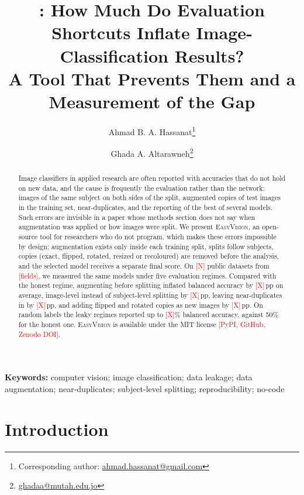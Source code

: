\documentclass[11pt,a4paper]{article}
\title{\EV: How Much Do Evaluation Shortcuts Inflate Image-Classification Results?\\ A Tool That Prevents Them and a Measurement of the Gap}
\author[1]{Ahmad B. A. Hassanat\thanks{Corresponding author: \href{mailto:ahmad.hassanat@gmail.com}{ahmad.hassanat@gmail.com}}}
\author[2]{Ghada A. Altarawneh\thanks{\href{mailto:ghadaa@mutah.edu.jo}{ghadaa@mutah.edu.jo}}}
\affil[1]{Faculty of Information Technology, Mutah University, Karak, Jordan}
\affil[2]{Department of Accounting, Mutah University, Karak, Jordan}
\date{\TBD{Plan and skeleton, 10 October 2026}}
\newcommand{\EV}{\textsc{EasyVision}}
\newcommand{\TBD}[1]{\textcolor{red}{[#1]}}
\newcommand{\pp}{\,pp}
\begin{document}
\maketitle

\begin{abstract}
Image classifiers in applied research are often reported with accuracies that do not hold on new data, and the cause is frequently the evaluation rather than the network: images of the same subject on both sides of the split, augmented copies of test images in the training set, near-duplicates, and the reporting of the best of several models. Such errors are invisible in a paper whose methods section does not say when augmentation was applied or how images were split. We present \EV, an open-source tool for researchers who do not program, which makes these errors impossible by design: augmentation exists only inside each training split, splits follow subjects, copies (exact, flipped, rotated, resized or recoloured) are removed before the analysis, and the selected model receives a separate final score. On \TBD{N} public datasets from \TBD{fields}, we measured the same models under five evaluation regimes. Compared with the honest regime, augmenting before splitting inflated balanced accuracy by \TBD{X}\pp{} on average, image-level instead of subject-level splitting by \TBD{X}\pp, leaving near-duplicates in by \TBD{X}\pp, and adding flipped and rotated copies as new images by \TBD{X}\pp. On random labels the leaky regimes reported up to \TBD{X}\% balanced accuracy, against 50\% for the honest one. \EV{} is available under the MIT license \TBD{PyPI, GitHub, Zenodo DOI}.
\end{abstract}

\noindent\textbf{Keywords:} computer vision; image classification; data leakage; data augmentation; near-duplicates; subject-level splitting; reproducibility; no-code

\section{Introduction}
\label{sec:intro}
\end{document}
